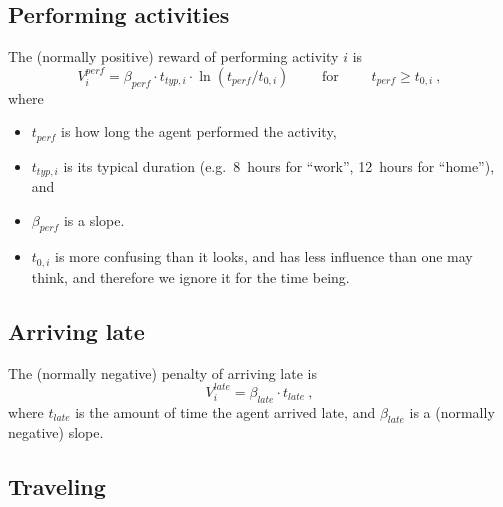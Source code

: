 \subsection{Performing activities}

The (normally positive) reward of performing activity $i$ is
\[
V^{perf}_i = \beta_{perf} \cdot t_{typ,i} \cdot \ln( t_{perf} / t_{0,i} ) 
%
\qquad \mbox{ for } \qquad
%
t_{perf} \ge t_{0,i} \ ,
\]
where
\begin{itemize}

\item
$t_{perf}$ is how long the agent performed the activity, 

\item $t_{typ,i}$ is its typical duration (e.g.\ 8~hours for ``work'', 12~hours for ``home''), and

\item $\beta_{perf}$ is a slope.

\item  $t_{0,i}$ is more confusing than it looks, and has less influence than one may think, and therefore we ignore it for the time being.

\end{itemize}

\subsection{Arriving late}

The (normally negative) penalty of arriving late is
\[
V^{late}_i = \beta_{late} \cdot t_{late} \ ,
\]
where $t_{late}$ is the amount of time the agent arrived late, and $\beta_{late}$ is a (normally negative) slope.

\subsection{Traveling}

